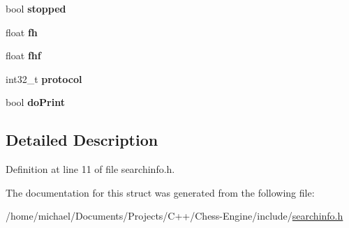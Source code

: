 \begin{DoxyCompactItemize}
bool {\bfseries stopped}
\item 
\mbox{\label{structSearchInfo_aaf93702aef0d1eb5754b0b1e35574631}} 
float {\bfseries fh}
\item 
\mbox{\label{structSearchInfo_a0a6e9abcf065a2c0f7245f47db569abe}} 
float {\bfseries fhf}
\item 
\mbox{\label{structSearchInfo_ac3f008988acc4aa6fceb4e120a9471cb}} 
int32\+\_\+t {\bfseries protocol}
\item 
\mbox{\label{structSearchInfo_a2cc71d1a67abdc16091a32f269685032}} 
bool {\bfseries do\+Print}
\end{DoxyCompactItemize}


\subsection{Detailed Description}


Definition at line 11 of file searchinfo.\+h.



The documentation for this struct was generated from the following file\+:\begin{DoxyCompactItemize}
\item 
/home/michael/\+Documents/\+Projects/\+C++/\+Chess-\/\+Engine/include/\mbox{\hyperlink{searchinfo_8h}{searchinfo.\+h}}\end{DoxyCompactItemize}
